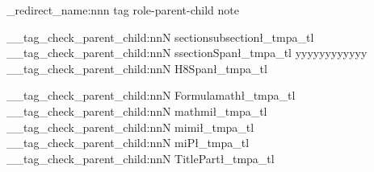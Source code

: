 \documentclass{article}
\begin{document}
\ExplSyntaxOn


 

\msg_redirect_name:nnn { tag } { role-parent-child } { note }


%
%
%



 



\__tag_check_parent_child:nnN {section}{subsection}\l_tmpa_tl 
\__tag_check_parent_child:nnN {ssection}{Span}\l_tmpa_tl yyyyyyyyyyyy 
\__tag_check_parent_child:nnN {H8}{Span}\l_tmpa_tl 

\__tag_check_parent_child:nnN {Formula}{math}\l_tmpa_tl 
\__tag_check_parent_child:nnN {math}{mi}\l_tmpa_tl 
\__tag_check_parent_child:nnN {mi}{mi}\l_tmpa_tl 
\__tag_check_parent_child:nnN 
{mi}{P}\l_tmpa_tl 
\__tag_check_parent_child:nnN {Title}{Part}\l_tmpa_tl 

\tagstructend
\ExplSyntaxOff
\end{document}
